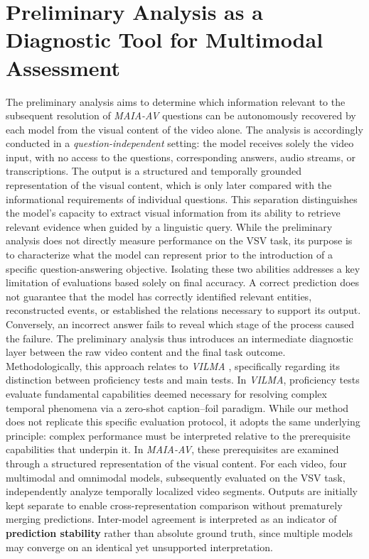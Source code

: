 \section{Preliminary Analysis as a Diagnostic Tool for Multimodal Assessment}
\label{sec:pa}
The preliminary analysis aims to determine which information relevant to the subsequent resolution of \textit{MAIA-AV} questions can be autonomously recovered by each model from the visual content of the video alone. The analysis is accordingly conducted in a \textit{question-independent} setting: the model receives solely the video input, with no access to the questions, corresponding answers, audio streams, or transcriptions. The output is a structured and temporally grounded representation of the visual content, which is only later compared with the informational requirements of individual questions.
This separation distinguishes the model's capacity to extract visual information from its ability to retrieve relevant evidence when guided by a linguistic query. While the preliminary analysis does not directly measure performance on the \acs{VSV} task, its purpose is to characterize what the model can represent prior to the introduction of a specific question-answering objective.
Isolating these two abilities addresses a key limitation of evaluations based solely on final accuracy. A correct prediction does not guarantee that the model has correctly identified relevant entities, reconstructed events, or established the relations necessary to support its output. Conversely, an incorrect answer fails to reveal which stage of the process caused the failure. The preliminary analysis thus introduces an intermediate diagnostic layer between the raw video content and the final task outcome.
Methodologically, this approach relates to \textit{VILMA} \cite{kesen2024vilma}, specifically regarding its distinction between proficiency tests and main tests. In \textit{VILMA}, proficiency tests evaluate fundamental capabilities deemed necessary for resolving complex temporal phenomena via a zero-shot caption--foil paradigm. While our method does not replicate this specific evaluation protocol, it adopts the same underlying principle: complex performance must be interpreted relative to the prerequisite capabilities that underpin it.
In \textit{MAIA-AV}, these prerequisites are examined through a structured representation of the visual content. For each video, four multimodal and omnimodal models, subsequently evaluated on the \acs{VSV} task, independently analyze temporally localized video segments. Outputs are initially kept separate to enable cross-representation comparison without prematurely merging predictions. Inter-model agreement is interpreted as an indicator of \textbf{prediction stability} rather than absolute ground truth, since multiple models may converge on an identical yet unsupported interpretation.
